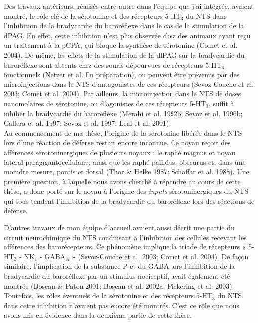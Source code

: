\documentclass[a4paper,12pt,twoside]{report}
\begin{document}
\bigskip 

Des travaux antérieurs, réalisés entre autre dans l’équipe que j’ai intégrée, avaient montré, le rôle clé de la sérotonine et des récepteurs 5-HT$_{3}$ du NTS dans l’inhibition de la bradycardie du baroréflexe dans le cas de la stimulation de la dPAG. En effet, cette inhibition n’est plus observée chez des animaux ayant reçu un traitement à la pCPA, qui bloque la synthèse de sérotonine (Comet et al. 2004). De même, les effets de la stimulation de la dlPAG sur la bradycardie du baroréflexe sont absents chez des souris dépourvues de récepteurs 5-HT$_{3}$ fonctionnels (Netzer et al. En préparation), ou peuvent être prévenus par des microinjections dans le NTS d’antagonistes de ces récepteurs (Sevoz-Couche et al. 2003; Comet et al. 2004). Par ailleurs, la microinjection dans le NTS de doses nanomolaires de sérotonine, ou d’agonistes de ces récepteurs 5-HT$_{3}$, suffit à inhiber la bradycardie du baroréflexe (Merahi et al. 1992b; Sevoz et al. 1996b; Callera et al. 1997; Sevoz et al. 1997; Leal et al. 2001).\\
Au commencement de ma thèse, l’origine de la sérotonine libérée dans le NTS lors d’une réaction de défense restait encore inconnue. Ce noyau reçoit des afférences sérotoninergiques de plusieurs noyaux : le raphé magnus et noyau latéral paragigantocellulaire, ainsi que les raphé pallidus, obscurus et, dans une moindre mesure, pontis et dorsal (Thor \& Helke 1987; Schaffar et al. 1988). Une première question, à laquelle nous avons cherché à répondre au cours de cette thèse, a donc porté sur le noyau à l’origine des \textit{inputs} sérotoninergiques du NTS qui sous tendent l’inhibition de la bradycardie du baroréflexe lors des réactions de défense.

\bigskip

D’autres travaux de mon équipe d’accueil avaient aussi décrit une partie du circuit neurochimique du NTS conduisant à l’inhibition des cellules recevant les afférences des barorécepteurs. Ce phénomène implique la triade de récepteurs « 5-HT$_{3}$ - NK$_{1}$ - GABA$_{A}$ » (Sevoz-Couche et al. 2003; Comet et al. 2004). De façon similaire, l’implication de la substance P et du GABA lors l’inhibition de la bradycardie du baroréflexe par un stimulus nociceptif, avait également été montrée (Boscan \& Paton 2001; Boscan et al. 2002a; Pickering et al. 2003). Toutefois, les rôles éventuels de la sérotonine et des récepteurs 5-HT$_{3}$ du NTS dans cette inhibition n’avaient pas encore été montrés. C’est ce rôle que nous avons mis en évidence dans la deuxième partie de cette thèse.
\end{document}
